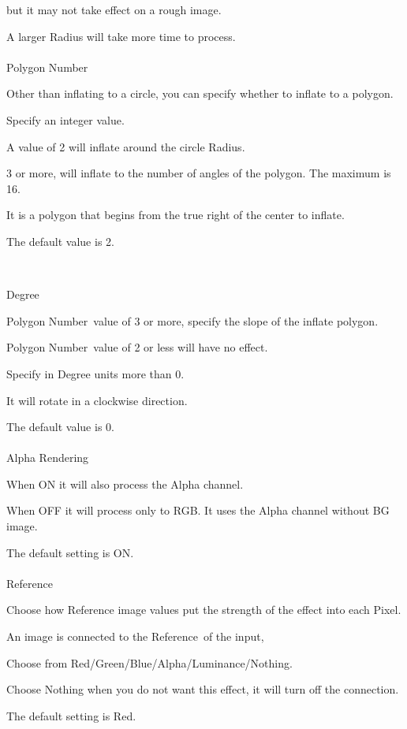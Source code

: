 \documentclass[a4paper,12pt]{article}
\begin{document}
but it may not take effect on a rough image.\par
A larger Radius will take more time to process.\\
\\
Polygon Number\par
Other than inflating to a circle, you can specify whether to inflate to a polygon.\par
Specify an integer value.\par
A value of 2 will inflate around the circle Radius.\par
3 or more, will inflate to the number of angles of the polygon. The maximum is 16.\par
It is a polygon that begins from the true right of the center to inflate.\par
The default value is 2.

\newpage

\thispagestyle{empty}

\ \vspace{-0.2em}
\\
\par
\noindent Degree\par
\textquotedbl Polygon Number\textquotedbl \ value of 3 or more, specify the slope of the inflate polygon.\par
\textquotedbl Polygon Number\textquotedbl \ value of 2 or less will have no effect.\par
Specify in Degree units more than 0.\par
It will rotate in a clockwise direction.\par
The default value is 0.\\
\\
Alpha Rendering\par
When ON it will also process the Alpha channel.\par
When OFF it will process only to RGB. It uses the Alpha channel without BG image.\par
The default setting is ON.\\
\\
Reference\par
Choose how Reference image values put the strength of the effect into each Pixel.\par
An image is connected to the \textquotedbl Reference\textquotedbl \ of the input,\par
Choose from Red/Green/Blue/Alpha/Luminance/Nothing.\par
Choose Nothing when you do not want this effect, it will turn off the connection.\par
The default setting is Red.
\end{document}
